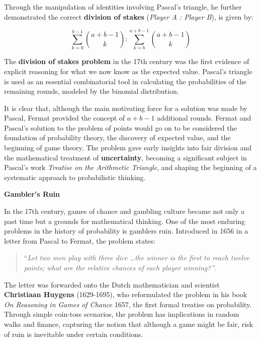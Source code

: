 Through the manipulation of identities involving Pascal's triangle, he further demonstrated the correct \textbf{division of stakes} (\textit{Player A : Player B}), is given by:

\begin{equation*}
\sum_{k=0}^{b-1} \binom{a+b-1}{k} : \sum_{k=b}^{a+b-1} \binom{a+b-1}{k}
\end{equation*} 

The \textbf{division of stakes problem} in the 17th century was the first evidence of explicit reasoning for what we now know as the expected value. Pascal's triangle is used as an essential combinatorial tool in calculating the probabilities of the remaining rounds, modeled by the binomial distribution. 

\vspace{0.5em}

It is clear that, although the main motivating force for a solution was made by Pascal, Fermat provided the concept of $a+b-1$  additional rounds. Fermat and Pascal's solution to the problem of points would go on to be considered the foundation of probability theory, the discovery of expected value, and the beginning of game theory. The problem gave early insights into fair division and the mathematical treatment of \textbf{uncertainty}, becoming a significant subject in Pascal's work \textit{Treatise on the Arithmetic Triangle}, and shaping the beginning of a systematic approach to probabilistic thinking.

\noindent \textbf{Gambler's Ruin}
\vspace{0.5em}

In the 17th century, games of chance and gambling culture became not only a past time but a grounds for mathematical thinking. One of the most enduring problems in the history of probability is gamblers ruin. Introduced in 1656 in a letter from Pascal to Fermat, the problem states: 
\begin{quote}
    ``\textit{Let two men play with three dice \dots the winner is the first to reach twelve points; what are the relative chances of each player winning?''}.
\end{quote}

The letter was forwarded onto the Dutch mathematician and scientist \textbf{Christiaan Huygens} (1629-1695), who reformulated the problem in his book \textit{On Reasoning in Games of Chance} 1657, the first formal treatise on probability. Through simple coin-toss scenarios, the problem has implications in random walks and finance, capturing the notion that although a game might be fair, risk of ruin is inevitable under certain conditions. 

